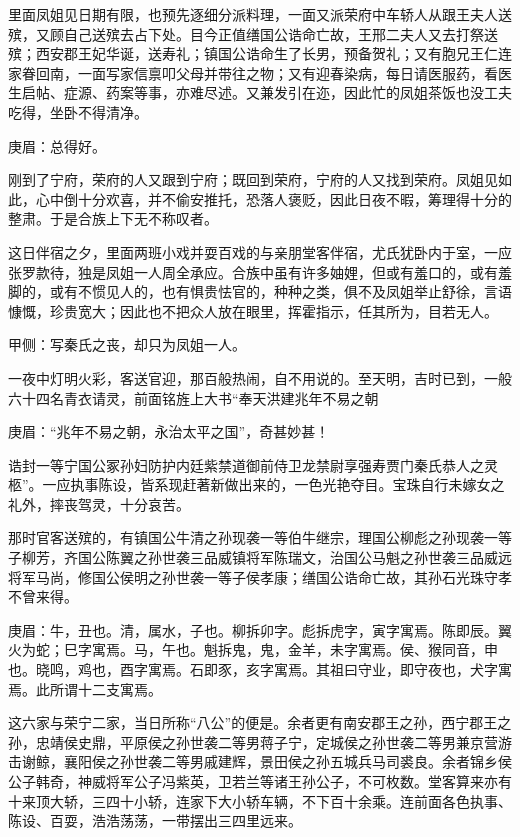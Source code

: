\begin{parag}
    里面凤姐见日期有限，也预先逐细分派料理，一面又派荣府中车轿人从跟王夫人送殡，又顾自己送殡去占下处。目今正值缮国公诰命亡故，王邢二夫人又去打祭送殡；西安郡王妃华诞，送寿礼；镇国公诰命生了长男，预备贺礼；又有胞兄王仁连家眷回南，一面写家信禀叩父母并带往之物；又有迎春染病，每日请医服药，看医生启帖、症源、药案等事，亦难尽述。又兼发引在迩，因此忙的凤姐茶饭也没工夫吃得，坐卧不得清净。\begin{note}庚眉：总得好。\end{note}刚到了宁府，荣府的人又跟到宁府；既回到荣府，宁府的人又找到荣府。凤姐见如此，心中倒十分欢喜，并不偷安推托，恐落人褒贬，因此日夜不暇，筹理得十分的整肃。于是合族上下无不称叹者。
\end{parag}


\begin{parag}
    这日伴宿之夕，里面两班小戏并耍百戏的与亲朋堂客伴宿，尤氏犹卧内于室，一应张罗款待，独是凤姐一人周全承应。合族中虽有许多妯娌，但或有羞口的，或有羞脚的，或有不惯见人的，也有惧贵怯官的，种种之类，俱不及凤姐举止舒徐，言语慷慨，珍贵宽大；因此也不把众人放在眼里，挥霍指示，任其所为，目若无人。\begin{note}甲侧：写秦氏之丧，却只为凤姐一人。\end{note}一夜中灯明火彩，客送官迎，那百般热闹，自不用说的。至天明，吉时已到，一般六十四名青衣请灵，前面铭旌上大书“奉天洪建兆年不易之朝\begin{note}庚眉：“兆年不易之朝，永治太平之国”，奇甚妙甚！\end{note}诰封一等宁国公冢孙妇防护内廷紫禁道御前侍卫龙禁尉享强寿贾门秦氏恭人之灵柩”。一应执事陈设，皆系现赶著新做出来的，一色光艳夺目。宝珠自行未嫁女之礼外，摔丧驾灵，十分哀苦。
\end{parag}


\begin{parag}
    那时官客送殡的，有镇国公牛清之孙现袭一等伯牛继宗，理国公柳彪之孙现袭一等子柳芳，齐国公陈翼之孙世袭三品威镇将军陈瑞文，治国公马魁之孙世袭三品威远将军马尚，修国公侯明之孙世袭一等子侯孝康；缮国公诰命亡故，其孙石光珠守孝不曾来得。\begin{note}庚眉：牛，丑也。清，属水，子也。柳拆卯字。彪拆虎字，寅字寓焉。陈即辰。翼火为蛇；巳字寓焉。马，午也。魁拆鬼，鬼，金羊，未字寓焉。侯、猴同音，申也。晓鸣，鸡也，酉字寓焉。石即豕，亥字寓焉。其祖曰守业，即守夜也，犬字寓焉。此所谓十二支寓焉。\end{note}这六家与荣宁二家，当日所称“八公”的便是。余者更有南安郡王之孙，西宁郡王之孙，忠靖侯史鼎，平原侯之孙世袭二等男蒋子宁，定城侯之孙世袭二等男兼京营游击谢鲸，襄阳侯之孙世袭二等男戚建辉，景田侯之孙五城兵马司裘良。余者锦乡侯公子韩奇，神威将军公子冯紫英，卫若兰等诸王孙公子，不可枚数。堂客算来亦有十来顶大轿，三四十小轿，连家下大小轿车辆，不下百十余乘。连前面各色执事、陈设、百耍，浩浩荡荡，一带摆出三四里远来。
\end{parag}


